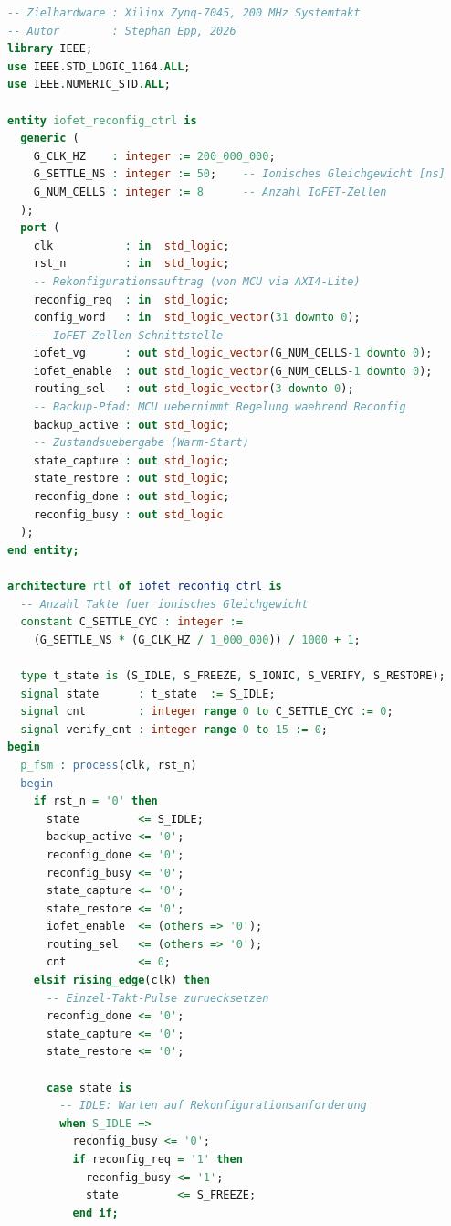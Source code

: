 ﻿\documentclass[a4paper,12pt]{scrreprt}
\theoremstyle{definition}
\begin{document}
\begin{lstlisting}[language=VHDL,
  caption={iofet\_reconfig\_ctrl.vhd -- Dreiphasige IoFET-Rekonfigurationssteuerung
    (Phase FREEZE / IONIC / RESTORE, Algorithmus~1, Abschnitt~3.3).},
  label={lst:iofet_reconfig}]
-- Zielhardware : Xilinx Zynq-7045, 200 MHz Systemtakt
-- Autor        : Stephan Epp, 2026
library IEEE;
use IEEE.STD_LOGIC_1164.ALL;
use IEEE.NUMERIC_STD.ALL;

entity iofet_reconfig_ctrl is
  generic (
    G_CLK_HZ    : integer := 200_000_000;
    G_SETTLE_NS : integer := 50;    -- Ionisches Gleichgewicht [ns]
    G_NUM_CELLS : integer := 8      -- Anzahl IoFET-Zellen
  );
  port (
    clk           : in  std_logic;
    rst_n         : in  std_logic;
    -- Rekonfigurationsauftrag (von MCU via AXI4-Lite)
    reconfig_req  : in  std_logic;
    config_word   : in  std_logic_vector(31 downto 0);
    -- IoFET-Zellen-Schnittstelle
    iofet_vg      : out std_logic_vector(G_NUM_CELLS-1 downto 0);
    iofet_enable  : out std_logic_vector(G_NUM_CELLS-1 downto 0);
    routing_sel   : out std_logic_vector(3 downto 0);
    -- Backup-Pfad: MCU uebernimmt Regelung waehrend Reconfig
    backup_active : out std_logic;
    -- Zustandsuebergabe (Warm-Start)
    state_capture : out std_logic;
    state_restore : out std_logic;
    reconfig_done : out std_logic;
    reconfig_busy : out std_logic
  );
end entity;

architecture rtl of iofet_reconfig_ctrl is
  -- Anzahl Takte fuer ionisches Gleichgewicht
  constant C_SETTLE_CYC : integer :=
    (G_SETTLE_NS * (G_CLK_HZ / 1_000_000)) / 1000 + 1;

  type t_state is (S_IDLE, S_FREEZE, S_IONIC, S_VERIFY, S_RESTORE);
  signal state      : t_state  := S_IDLE;
  signal cnt        : integer range 0 to C_SETTLE_CYC := 0;
  signal verify_cnt : integer range 0 to 15 := 0;
begin
  p_fsm : process(clk, rst_n)
  begin
    if rst_n = '0' then
      state         <= S_IDLE;
      backup_active <= '0';
      reconfig_done <= '0';
      reconfig_busy <= '0';
      state_capture <= '0';
      state_restore <= '0';
      iofet_enable  <= (others => '0');
      routing_sel   <= (others => '0');
      cnt           <= 0;
    elsif rising_edge(clk) then
      -- Einzel-Takt-Pulse zuruecksetzen
      reconfig_done <= '0';
      state_capture <= '0';
      state_restore <= '0';

      case state is
        -- IDLE: Warten auf Rekonfigurationsanforderung
        when S_IDLE =>
          reconfig_busy <= '0';
          if reconfig_req = '1' then
            reconfig_busy <= '1';
            state         <= S_FREEZE;
          end if;


\end{lstlisting}
\end{document}
